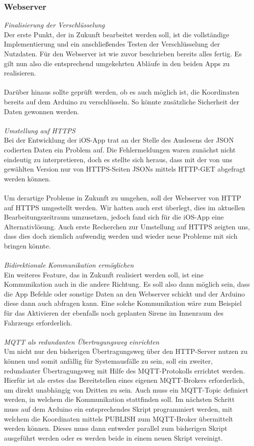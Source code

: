 \subsubsection{Webserver} 
\textit{Finalisierung der Verschlüsselung}
\\
Der erste Punkt, der in Zukunft bearbeitet werden soll, ist die vollständige Implementierung und ein anschließendes Testen der Verschlüsselung der Nutzdaten. Für den Webserver ist wie zuvor beschrieben bereits alles fertig. Es gilt nun also die entsprechend umgekehrten Abläufe in den beiden Apps zu realisieren.
\\
\\
Darüber hinaus sollte geprüft werden, ob es auch möglich ist, die Koordinaten bereits auf dem Arduino zu verschlüsseln. So könnte zusätzliche Sicherheit der Daten gewonnen werden.
\\
\\
\textit{Umstellung auf HTTPS}
\\
Bei der Entwicklung der iOS-App trat an der Stelle des Auslesens der JSON codierten Daten ein Problem auf. Die Fehlermeldungen waren zunächst nicht eindeutig zu interpretieren, doch es stellte sich heraus, dass mit der von uns gewählten Version nur von HTTPS-Seiten JSONs mittels HTTP-GET abgefragt werden können.
\\
\\
Um derartige Probleme in Zukunft zu umgehen, soll der Webserver von HTTP auf HTTPS umgestellt werden. Wir hatten auch erst überlegt, dies im aktuellen Bearbeitungszeitraum umzusetzen, jedoch fand sich für die iOS-App eine Alternativlösung. Auch erste Recherchen zur Umstellung auf HTTPS zeigten uns, dass dies doch ziemlich aufwendig werden und wieder neue Probleme mit sich bringen könnte.
\\
\\
\textit{Bidirektionale Kommunikation ermöglichen}
\\
Ein weiteres Feature, das in Zukunft realisiert werden soll, ist eine Kommunikation auch in die andere Richtung. Es soll also dann möglich sein, dass die App Befehle oder sonstige Daten an den Webserver schickt und der Arduino diese dann auch abfragen kann. Eine solche Kommunikation wäre zum Beispiel für das Aktivieren der ebenfalls noch geplanten Sirene im Innenraum des Fahrzeugs erforderlich.
\\
\\
\textit{MQTT als redundanten Übertragungsweg einrichten}
\\
Um nicht nur den bisherigen Übertragungsweg über den HTTP-Server nutzen zu können und somit anfällig für Systemausfälle zu sein, soll ein zweiter, redundanter Übertragungsweg mit Hilfe des MQTT-Protokolls errichtet werden. Hierfür ist als erstes das Bereitstellen eines eigenen MQTT-Brokers erforderlich, um direkt unabhängig von Dritten zu sein. Auch muss ein MQTT-Topic definiert werden, in welchem die Kommunikation stattfinden soll. Im nächsten Schritt muss auf dem Arduino ein entsprechendes Skript programmiert werden, mit welchem die Koordinaten mittels PUBLISH zum MQTT-Broker übermittelt werden können. Dieses muss dann entweder parallel zum bisherigen Skript ausgeführt werden oder es werden beide in einem neuen Skript vereinigt.
